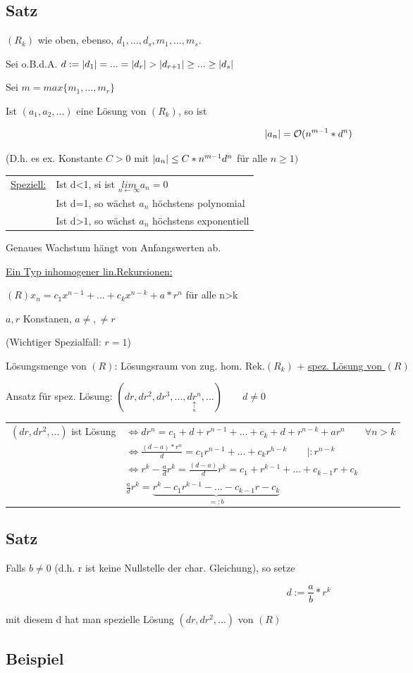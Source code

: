 
\subsection{Satz}
$(R_k)$ wie oben, ebenso, $d_1,...,d_s, m_1,...,m_s.$

Sei o.B.d.A. $d:= \abs{d_1}=...=\abs{d_r}>\abs{d_{r+1}}\geq...\geq \abs{d_s}$

Sei $m = max\{m_1,...,m_r\}$

Ist $(a_1,a_2,...) $ eine Lösung von $(R_k)$, so ist 

$$ \left|a_n\right| = \mathcal{O}(n^{m-1}*d^n)$$

(D.h. es ex. Konstante $C>0$ mit $\left|a_n\right| \leq C*n^{m-1}d^n$ für alle $n \geq 1)$

\begin{tabular}{l l}
\underline{Speziell:}& Ist d<1, si ist $\underset{n\leftarrow \infty}{lim} a_n = 0$\\
& Ist d=1, so wächst $a_n$ höchstens polynomial\\
& Ist d>1, so wächst $a_n$ höchstens exponentiell
\end{tabular}

Genaues Wachstum hängt von Anfangswerten ab.

\underline{Ein Typ inhomogener lin.Rekursionen:}

$(R) x_n = c_1x^{n-1}+...+c_kx^{n-k}+a*r^n$ \qquad für alle n>k

$a,r$ Konstanen, $a\neq , \neq r$

(Wichtiger Spezialfall: $r=1$)

Lösungsmenge von $(R)$: Lösungsraum von zug. hom. Rek.$(R_k)$ + \underline{spez. Lösung von $(R)$}

Ansatz für spez. Lösung: $(dr,dr^2,dr^3,..., \underset{ \underset{n} { \uparrow }}{dr^n},...) \qquad d \neq 0$

\begin{tabular}{l l}
$(dr,dr^2,...)$ ist Lösung &$\Leftrightarrow dr^n = c_1+d+r^{n-1}+...+c_k+d+r^{n-k}+ar^n \qquad \forall n> k$\\
& $\Leftrightarrow \frac{(d-a)*r^n}{d}=c_1r^{n-1}+...+c_kr^{h-k} \qquad | :r^{n-k}$\\
& $\Leftrightarrow r^k - \frac{a}{d}r^k=\frac{(d-a)}{d}r^k=c_1+r^{k-1}+...+c_{k-1}r+c_k$ \\
& $\frac{a}{d} r^k = \underbrace{r^k-c_1r^{k-1}-...-c_{k-1}r-c_k}_{=:b}$
\end{tabular}
 
\subsection{Satz}
Falls $b\neq 0$ (d.h. r ist keine Nullstelle der char. Gleichung), so setze

$$ d:= \frac{a}{b}*r^k$$

mit diesem d hat man spezielle Lösung $(dr,dr^2,...)$ von $(R)$


\subsection{Beispiel} %

